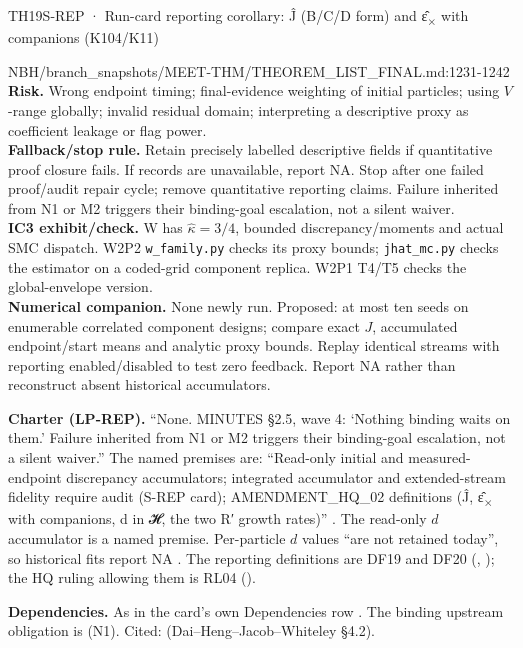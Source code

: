 \begin{card}{TH19}{S-REP · Run-card reporting corollary: Ĵ (B/C/D form) and ε̂\textsubscript{×} with companions (K104/K11)}
\begin{stmt}{NBH/branch_snapshots/MEET-THM/THEOREM_LIST_FINAL.md:1231-1242}
\textbf{Risk.} Wrong endpoint timing; final-evidence weighting of initial particles; using $V$-range globally; invalid residual domain; interpreting a descriptive proxy as coefficient leakage or flag power.\\
\textbf{Fallback/stop rule.} Retain precisely labelled descriptive fields if quantitative proof closure fails. If records are unavailable, report NA. Stop after one failed proof/audit repair cycle; remove quantitative reporting claims. Failure inherited from N1 or M2 triggers their binding-goal escalation, not a silent waiver.\\
\textbf{IC3 exhibit/check.} W has $\widehat\kappa=3/4$, bounded discrepancy/moments and actual SMC dispatch. W2P2 \texttt{w\_family.py} checks its proxy bounds; \texttt{jhat\_mc.py} checks the estimator on a coded-grid component replica. W2P1 T4/T5 checks the global-envelope version.\\
\textbf{Numerical companion.} None newly run. Proposed: at most ten seeds on enumerable correlated component designs; compare exact $J$, accumulated endpoint/start means and analytic proxy bounds. Replay identical streams with reporting enabled/disabled to test zero feedback. Report NA rather than reconstruct absent historical accumulators.
\end{stmt}

\textbf{Charter (LP-REP).} ``None. MINUTES §2.5, wave 4: `Nothing binding waits on them.' Failure inherited from N1 or M2 triggers their binding-goal escalation, not a silent waiver.'' The named premises are: ``Read-only initial and measured-endpoint discrepancy accumulators; integrated accumulator and extended-stream fidelity require audit (S-REP card); AMENDMENT\_HQ\_02 definitions (Ĵ, ε̂\textsubscript{×} with companions, d in 𝓗, the two R′ growth rates)'' . The read-only $d$ accumulator is a named premise. Per-particle $d$ values ``are not retained today'', so historical fits report NA . The reporting definitions are DF19 and DF20 (, ); the HQ ruling allowing them is RL04 ().

\textbf{Dependencies.} As in the card's own Dependencies row . The binding upstream obligation is  (N1). Cited:  (Dai--Heng--Jacob--Whiteley §4.2).


\end{card}
